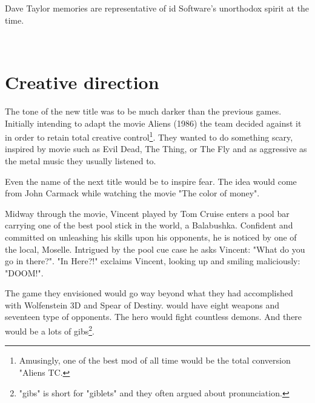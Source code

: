Dave Taylor memories are representative of id Software's unorthodox spirit at the time.\\
\par
\vspace{11pt}
\\
\par
\vspace{11pt}





\section{Creative direction}
The tone of the new title was to be much darker than the previous games. Initially intending to adapt the movie Aliens (1986) the team decided against it in order to retain total creative control\footnote{Amusingly, one of the best mod of all time would be the total conversion "Aliens TC.}. They wanted to do something scary, inspired by movie such as Evil Dead, The Thing, or The Fly and as aggressive as the metal music they usually listened to.\\
\par
Even the name of the next title would be to inspire fear. The idea would come from John Carmack while watching the movie "The color of money".\\ 
\par
Midway through the movie, Vincent played by Tom Cruise enters a pool bar carrying one of the best pool stick in the world, a Balabushka. Confident and committed on unleashing his skills upon his opponents, he is noticed by one of the local, Moselle. Intrigued by the pool cue case he asks Vincent: "What do you go in there?". "In Here?!" exclaims Vincent, looking up and smiling maliciously: "DOOM!".\\
\par

\par
{}
\par
\vspace{-5pt}
The game they envisioned would go way beyond what they had accomplished with Wolfenstein 3D and Spear of Destiny. \doom{} would have eight weapons and seventeen type of opponents. The hero would fight countless demons. And there would be a lots of gibs\footnote{"gibs" is short for "giblets" and they often argued about pronunciation.}.

